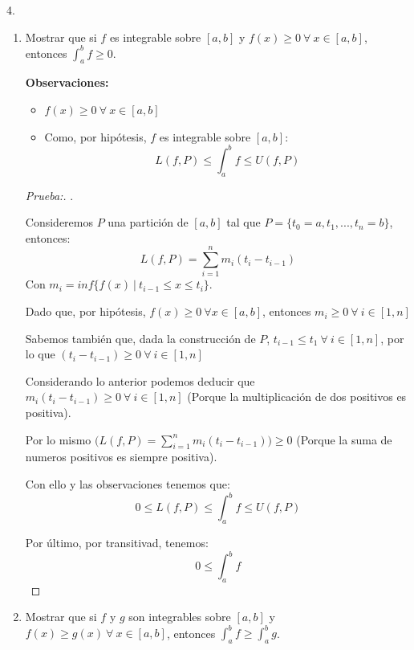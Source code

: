 \documentclass[12pt]{article}
\begin{document}
4.
\begin{enumerate}[\hspace{9px} a)]
    \item Mostrar que si $f$ es integrable sobre $[a,b]$ y \(f(x) \geq 0 \ \forall \ x \in [a,b]\), entonces \(\displaystyle\int_{a}^{b}f \geq 0\).\medskip

        \textbf{Observaciones: }
        \begin{itemize}
            \item \(f(x) \geq 0 \ \forall \ x \in [a,b]\)
            \item Como, por hip\'otesis, $f$ es integrable sobre $[a,b]$: \[L(f,P)\leq\int_{a}^{b}f\leq U(f,P)\]
        \end{itemize}

        \begin{proof}[Prueba:]
            . \medskip

            Consideremos $P$ una partici\'on de $[a,b]$ tal que \(P=\{t_0=a,t_1,...,t_n=b\}\), entonces:
            \[L(f,P) = \sum_{i=1}^n m_i(t_i-t_{i-1})\]
            Con \(m_i=inf\{f(x) \ | \ t_{i-1} \leq x \leq t_i\}\).\medskip

            Dado que, por hip\'otesis, \(f(x)\geq 0 \ \forall x \in [a,b]\), entonces \(m_i \geq 0 \ \forall \ i \in [1,n]\)\medskip

            Sabemos tambi\'en que, dada la construcci\'on de $P$, \(t_{i-1}\leq t_1 \ \forall \ i \in [1,n]\), por lo que \((t_i-t_{i-1})\geq 0 \ \forall \ i \in [1,n]\)\medskip

            Considerando lo anterior podemos deducir que \(m_i(t_i-t_{i-1})\geq 0 \ \forall \ i \in [1,n]\) (Porque la multiplicaci\'on de dos positivos es positiva).\medskip

            Por lo mismo \(\big(L(f,P) = \sum_{i=1}^n m_i(t_i-t_{i-1})\big)\geq 0\) (Porque la suma de numeros positivos es siempre positiva).

            Con ello y las observaciones tenemos que:
            \[0\leq L(f,P)\leq\int_{a}^{b}f\leq U(f,P)\]

            Por \'ultimo, por transitivad, tenemos:
            \[0\leq \int_{a}^{b}f\]
        \end{proof}


    \item Mostrar que si $f$ y $g$ son integrables sobre $[a,b]$ y \(f(x) \geq g(x) \ \forall \ x \in [a,b]\), entonces \(\displaystyle\int_{a}^{b}f \geq \displaystyle\int_{a}^{b}g\).\medskip


\end{enumerate}
\end{document}
